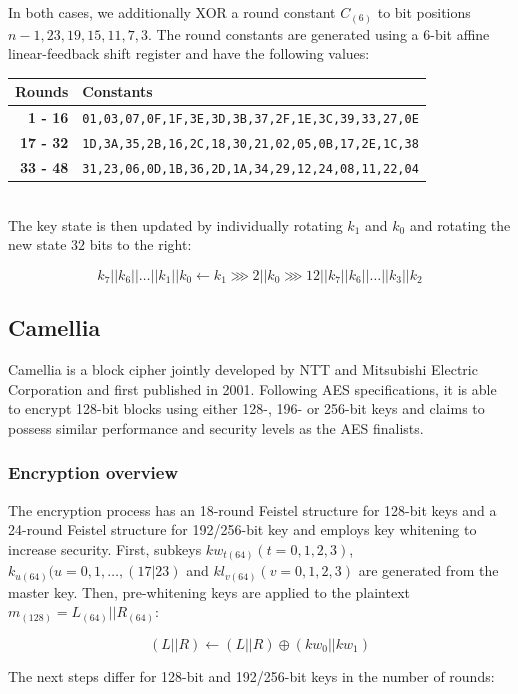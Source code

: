 In both cases, we additionally XOR a round constant $C_{(6)}$ to bit positions
$n-1,23,19,15,11,7,3$. The round constants are generated using a 6-bit affine
linear-feedback shift register and have the following values:\\

\begin{tabular}{r|l}
    \textbf{Rounds} & \textbf{Constants} \\
    \hline
    \textbf{1 - 16} &  \small\texttt{01,03,07,0F,1F,3E,3D,3B,37,2F,1E,3C,39,33,27,0E} \\
    \textbf{17 - 32} & \small\texttt{1D,3A,35,2B,16,2C,18,30,21,02,05,0B,17,2E,1C,38} \\
    \textbf{33 - 48} & \small\texttt{31,23,06,0D,1B,36,2D,1A,34,29,12,24,08,11,22,04}
\end{tabular}\\

The key state is then updated by individually rotating $k_1$ and $k_0$ and
rotating the new state $32$ bits to the right:

\[
    k_7||k_6||\dots||k_1||k_0\leftarrow k_1\ggg 2||k_0\ggg 12||k_7||k_6||\dots||k_3||k_2
\]

\subsection{Camellia}

Camellia\cite{camellia:2001} is a block cipher jointly developed by NTT and
Mitsubishi Electric Corporation and first published in 2001. Following AES
specifications, it is able to encrypt 128-bit blocks using either 128-, 196- or
256-bit keys and claims to possess similar performance and security levels as
the AES finalists.

\subsubsection{Encryption overview}

The encryption process has an 18-round Feistel structure for 128-bit keys and a
24-round Feistel structure for 192/256-bit key and employs key whitening to
increase security. First, subkeys $kw_{t(64)}(t=0,1,2,3)$,
$k_{u(64)}(u=0,1,\dots,(17|23)$ and $kl_{v(64)}(v=0,1,2,3)$ are generated from
the master key. Then, pre-whitening keys are applied to the plaintext
$m_{(128)}=L_{(64)}||R_{(64)}$:

\[
    (L||R)\leftarrow (L||R)\oplus (kw_0||kw_1)
\]

The next steps differ for 128-bit and 192/256-bit keys in the number of rounds:


